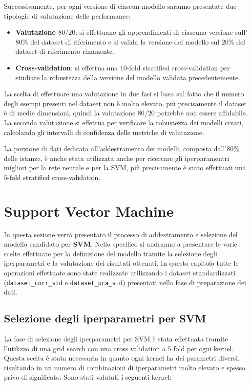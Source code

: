 Successivamente, per ogni versione di ciascun modello saranno presentate due
tipologie di valutazione delle performance:
\begin{itemize}
    \item \textbf{Valutazione $80/20$}: si effettuano gli apprendimenti di
          ciascuna versione sull'$80\%$ del dataset di riferimento e si valida
          la versione del modello sul $20\%$ del dataset di riferimento rimanente.
    \item \textbf{Cross-validation}: si effettua una $10$-fold stratified
          cross-validation per studiare la robustezza della versione del modello
          validata precedentemente.
\end{itemize}
La scelta di effettuare una valutazione in due fasi si basa sul fatto che il
numero degli esempi presenti nel dataset non è molto elevato, più precisamente
il dataset è di medie dimensioni, quindi la valutazione $80/20$ potrebbe non
essere affidabile. La seconda valutazione si effettua per verificare la
robustezza dei modelli creati, calcolando gli intervalli di confidenza delle
metriche di valutazione.

La porzione di dati dedicata all'addestramento dei modelli, composta dall'$80\%$
delle istanze, è anche stata utilizzata anche per ricercare gli iperparamentri 
migliori per la rete neurale e per la SVM, più precisamente è stato effettuati 
una $5$-fold stratified cross-validation.

\section{Support Vector Machine}
In questa sezione verrà presentato il processo di addestramento e selezione del modello
candidato per \textbf{SVM}. Nello specifico si andranno a presentare le varie scelte
effettuate per la definizione del modello tramite la selezione degli iperparametri e 
la valutazione dei risultati ottenuti.
In questo capitolo tutte le operazioni effettuate sono state realizzate 
utilizzando i dataset standardizzati (\texttt{dataset\_corr\_std} e 
\texttt{dataset\_pca\_std}) presentati nella fase di preparazione dei 
dati.

\subsection{Selezione degli iperparametri per SVM}
La fase di selezione degli iperparametri per SVM è stata effettuata tramite 
l'utilizzo di una grid search con una cross validation a 5 fold per ogni kernel.
Questa scelta è stata necessaria in quanto ogni kernel ha dei parametri diversi,
risultando in un numero di combinazioni di iperparametri molto elevato e spesso 
privo di significato.
Sono stati valutati i seguenti kernel:

